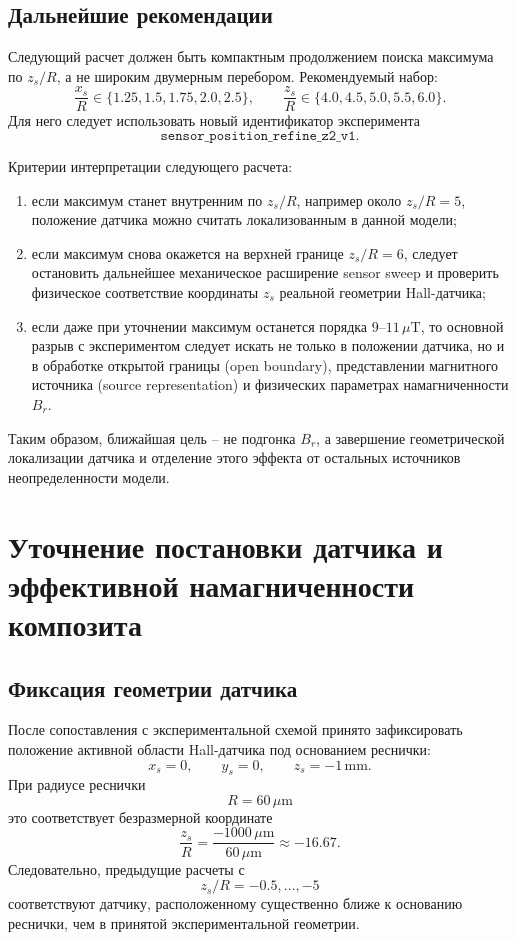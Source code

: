 \documentclass[12pt,a4paper]{article}
\begin{document}
\subsection*{Дальнейшие рекомендации}

Следующий расчет должен быть компактным продолжением поиска максимума по
\(z_s/R\), а не широким двумерным перебором. Рекомендуемый набор:
\[
    \frac{x_s}{R}\in\{1.25,1.5,1.75,2.0,2.5\},
    \qquad
    \frac{z_s}{R}\in\{4.0,4.5,5.0,5.5,6.0\}.
\]
Для него следует использовать новый идентификатор эксперимента
\[
    \texttt{sensor\_position\_refine\_z2\_v1}.
\]

Критерии интерпретации следующего расчета:
\begin{enumerate}
    \item если максимум станет внутренним по \(z_s/R\), например около
    \(z_s/R=5\), положение датчика можно считать локализованным в данной
    модели;

    \item если максимум снова окажется на верхней границе \(z_s/R=6\), следует
    остановить дальнейшее механическое расширение sensor sweep и проверить
    физическое соответствие координаты \(z_s\) реальной геометрии Hall-датчика;

    \item если даже при уточнении максимум останется порядка
    \(9\)--\(11\,\mu\mathrm{T}\), то основной разрыв с экспериментом следует
    искать не только в положении датчика, но и в обработке открытой границы
    (open boundary), представлении магнитного источника (source representation)
    и физических параметрах намагниченности \(B_r\).
\end{enumerate}

Таким образом, ближайшая цель -- не подгонка \(B_r\), а завершение
геометрической локализации датчика и отделение этого эффекта от остальных
источников неопределенности модели.

\section{Уточнение постановки датчика и эффективной намагниченности композита}

\subsection*{Фиксация геометрии датчика}

После сопоставления с экспериментальной схемой принято зафиксировать положение
активной области Hall-датчика под основанием реснички:
\[
    x_s=0,\qquad y_s=0,\qquad z_s=-1\,\mathrm{mm}.
\]
При радиусе реснички
\[
    R=60\,\mu\mathrm{m}
\]
это соответствует безразмерной координате
\[
    \frac{z_s}{R}
    =
    \frac{-1000\,\mu\mathrm{m}}{60\,\mu\mathrm{m}}
    \approx -16.67.
\]
Следовательно, предыдущие расчеты с
\[
    z_s/R=-0.5,\ldots,-5
\]
соответствуют датчику, расположенному существенно ближе к основанию реснички,
чем в принятой экспериментальной геометрии.
\end{document}

